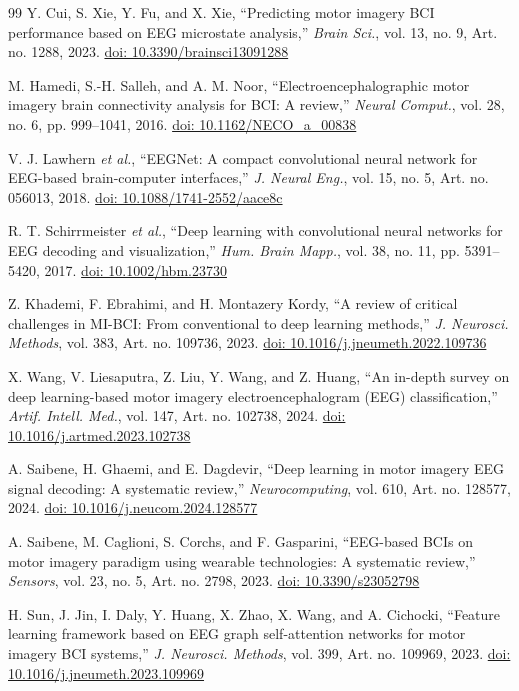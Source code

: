 \documentclass{ieeeaccess}
\newcommand{\doiref}[1]{\href{https://doi.org/#1}{doi: #1}}
\begin{document}
\begin{thebibliography}{99}
 Y. Cui, S. Xie, Y. Fu, and X. Xie, ``Predicting motor imagery BCI performance based on EEG microstate analysis,'' \emph{Brain Sci.}, vol. 13, no. 9, Art. no. 1288, 2023. \doiref{10.3390/brainsci13091288}

 M. Hamedi, S.-H. Salleh, and A. M. Noor, ``Electroencephalographic motor imagery brain connectivity analysis for BCI: A review,'' \emph{Neural Comput.}, vol. 28, no. 6, pp. 999--1041, 2016. \doiref{10.1162/NECO_a_00838}

 V. J. Lawhern \textit{et al.}, ``EEGNet: A compact convolutional neural network for EEG-based brain-computer interfaces,'' \emph{J. Neural Eng.}, vol. 15, no. 5, Art. no. 056013, 2018. \doiref{10.1088/1741-2552/aace8c}

 R. T. Schirrmeister \textit{et al.}, ``Deep learning with convolutional neural networks for EEG decoding and visualization,'' \emph{Hum. Brain Mapp.}, vol. 38, no. 11, pp. 5391--5420, 2017. \doiref{10.1002/hbm.23730}

 Z. Khademi, F. Ebrahimi, and H. Montazery Kordy, ``A review of critical challenges in MI-BCI: From conventional to deep learning methods,'' \emph{J. Neurosci. Methods}, vol. 383, Art. no. 109736, 2023. \doiref{10.1016/j.jneumeth.2022.109736}

 X. Wang, V. Liesaputra, Z. Liu, Y. Wang, and Z. Huang, ``An in-depth survey on deep learning-based motor imagery electroencephalogram (EEG) classification,'' \emph{Artif. Intell. Med.}, vol. 147, Art. no. 102738, 2024. \doiref{10.1016/j.artmed.2023.102738}

 A. Saibene, H. Ghaemi, and E. Dagdevir, ``Deep learning in motor imagery EEG signal decoding: A systematic review,'' \emph{Neurocomputing}, vol. 610, Art. no. 128577, 2024. \doiref{10.1016/j.neucom.2024.128577}

 A. Saibene, M. Caglioni, S. Corchs, and F. Gasparini, ``EEG-based BCIs on motor imagery paradigm using wearable technologies: A systematic review,'' \emph{Sensors}, vol. 23, no. 5, Art. no. 2798, 2023. \doiref{10.3390/s23052798}

 H. Sun, J. Jin, I. Daly, Y. Huang, X. Zhao, X. Wang, and A. Cichocki, ``Feature learning framework based on EEG graph self-attention networks for motor imagery BCI systems,'' \emph{J. Neurosci. Methods}, vol. 399, Art. no. 109969, 2023. \doiref{10.1016/j.jneumeth.2023.109969}


\end{thebibliography}
\end{document}
